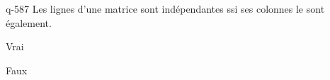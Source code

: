 \begin{truefalse}{q-587}
Les lignes d'une matrice sont indépendantes ssi ses colonnes le sont également.
\item Vrai
\item* Faux
\end{truefalse}

